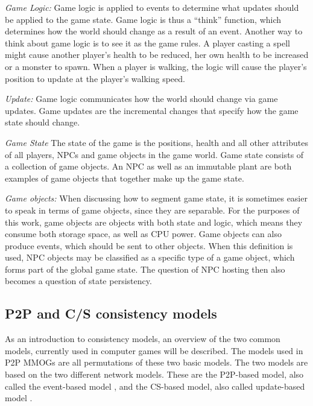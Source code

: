 \documentclass[10pt,a4paper,journal,cspaper,compsoc]{IEEEtran}
\begin{document}
\emph{Game Logic:} Game logic is applied to events to determine what updates should be applied to the game state. Game logic is thus a
    ``think'' function, which determines how the world should change as a result of an event. Another way to think about game logic is to see
    it as the game rules. A player casting a spell might cause another player's health to be reduced, her own health to be increased or a
    monster to spawn. When a player is walking, the logic will cause the player's position to update at the player's walking speed.

\emph{Update:} Game logic communicates how the world should change via game updates. Game updates are the incremental changes that specify how
    the game state should change.

\emph{Game State} The state of the game is the positions, health and all other attributes of all players, NPCs and game objects in the game
    world. Game state consists of a collection of game objects. An NPC as well as an immutable plant are both examples of game objects that
    together make up the game state.

\emph{Game objects:} When discussing how to segment game state, it is sometimes easier to speak in terms of game objects, since they are
    separable. For the purposes of this work, game objects are objects with both state and logic, which means they consume both storage
    space, as well as CPU power. Game objects can also produce events, which should be sent to other objects. When this definition is used,
    NPC objects may be classified as a specific type of a game object, which forms part of the global game state. The question of NPC hosting
    then also becomes a question of state persistency.



\subsection{P2P and C/S consistency models}
\label{p2p_cs_models}

As an introduction to consistency models, an overview of the two common models, currently used in computer games will be described. The models used
in P2P MMOGs are all permutations of these two basic models. The two models are based on the two different network models. These are the P2P-based
model, also called the event-based model \cite{p2p_cm_aoe}, and the \ac{CS}-based model, also called update-based model \cite{unreal_networking}.
\end{document}
